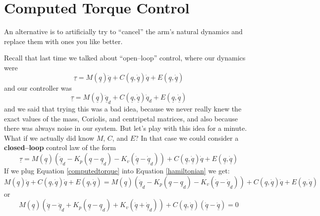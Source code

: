 \documentclass[]{article}
\begin{document}
\section{Computed Torque Control}
An alternative is to artificially try to ``cancel'' the arm's natural dynamics and replace them with ones you like better.

Recall that last time we talked about ``open--loop'' control, where our dynamics were
\begin{displaymath}
 \underline{\tau} = M(\underline{q}) \ddot{\underline{q}} +C(\underline{q}, \underline{\dot{q}})\dot{q} + E(\underline{q}, \underline{\dot{q}})
\end{displaymath}
and our controller was 
\begin{displaymath}
 \underline{\tau} = M(\underline{q}) \ddot{\underline{q}}_{d} +C(\underline{q}, \underline{\dot{q}})\dot{q}_{d} + E(\underline{q}, \underline{\dot{q}})
\end{displaymath}
and we said that trying this was a bad idea, because we never really knew the exact values of the mass, Coriolis, and centripetal matrices, and also because there was always noise in our system. But let's play with this idea for a minute. What if we actually did know $M$, $C$, and $E$? In that case we could consider a \textbf{closed--loop} control law of the form
\begin{equation}
 \underline{\tau} = M(\underline{q})( \ddot{\underline{q}}_{d}- K_{p}(\underline{q} - \underline{q}_{d}) - K_{v}(\underline{\dot{q}} - \underline{\dot{q}}_{d})) +C(\underline{q}, \underline{\dot{q}})\dot{q} + E(\underline{q}, \underline{\dot{q}})  \label{computedtorque}
\end{equation}
If we plug Equation \ref{computedtorque} into Equation \ref{hamiltonian} we get:
\begin{displaymath}
 M(\underline{q}) \ddot{\underline{q}} +C(\underline{q}, \underline{\dot{q}})\dot{q} + E(\underline{q}, \underline{\dot{q}}) =  M(\underline{q})( \ddot{\underline{q}}_{d}- K_{p}(\underline{q} - \underline{q}_{d}) - K_{v}(\underline{\dot{q}} - \underline{\dot{q}}_{d})) +C(\underline{q}, \underline{\dot{q}})\dot{q} + E(\underline{q}, \underline{\dot{q}})
 \end{displaymath}
 or
 \begin{displaymath}
 M(\underline{q})(\ddot{\underline{q}} - \ddot{\underline{q}}_{d} + K_{p}(\underline{q} - \underline{q}_{d})+ K_{v}(\underline{\dot{q}} + \underline{\dot{q}}_{d})) + C(\underline{q}, \underline{\dot{q}})(\dot{\underline{q}} - \dot{\underline{q}})  = 0 
\end{displaymath}
\end{document}
